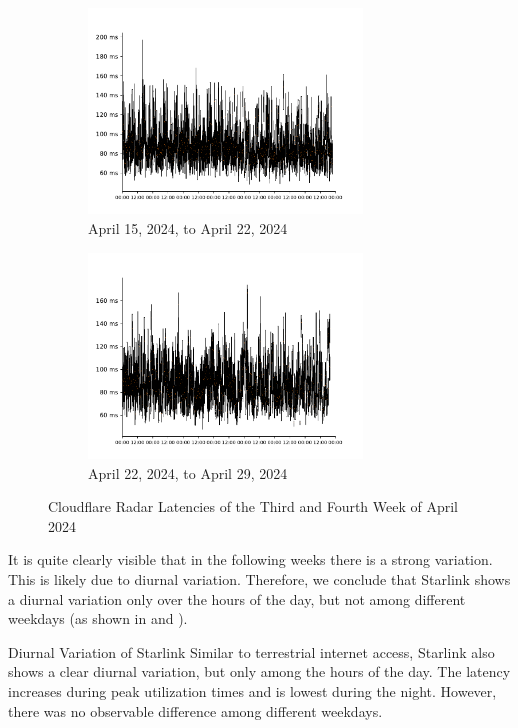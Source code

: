 \begin{figure}
	\centering
	\begin{subfigure}[b]{\textwidth}
		\centering
		\includegraphics[width=0.8\textwidth]{chapters/4-results/latency/img/cf_radar_latencies_2024-04-15_2024-04-22.pdf}
		\caption{April 15, 2024, to April 22, 2024}
	\end{subfigure}
	\begin{subfigure}[b]{\textwidth}
		\centering
		\includegraphics[width=0.8\textwidth]{chapters/4-results/latency/img/cf_radar_latencies_2024-04-22_2024-04-29.pdf}
		\caption{April 22, 2024, to April 29, 2024}
	\end{subfigure}
	\caption{Cloudflare Radar Latencies of the Third and Fourth Week of April 2024}
	\label{fig:latency-per-weekday-weeks-2}
\end{figure}

It is quite clearly visible that in the following weeks there is a strong
variation. This is likely due to diurnal variation. Therefore, we conclude that
Starlink shows a diurnal variation only over the hours of the day, but not
among different weekdays (as shown in  and
).

\begin{takeaway}{Diurnal Variation of Starlink}
	Similar to terrestrial internet access, Starlink also shows a clear
	diurnal variation, but only among the hours of the day. The latency
	increases during peak utilization times and is lowest during the night.
	However, there was no observable difference among different weekdays.
\end{takeaway}
